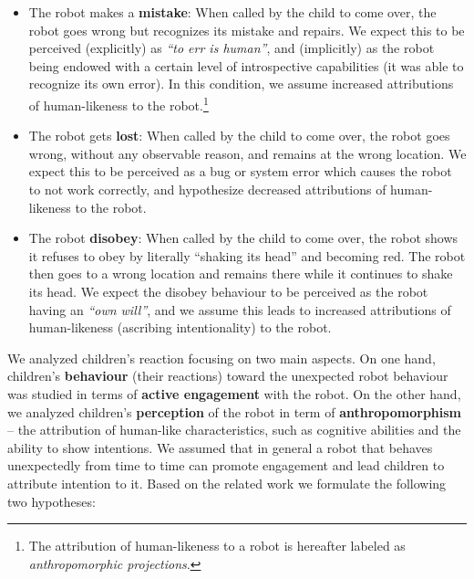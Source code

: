 \documentclass{sig-alternate}
\begin{document}
\begin{itemize}

    \item The robot makes a \textbf{mistake}: When called by the child to come
        over, the robot goes wrong but recognizes its mistake and repairs. We
        expect this to be perceived (explicitly) as \textit{``to err is
        human''}, and (implicitly) as the robot being endowed with a certain
        level of introspective capabilities (it was able to recognize its own
        error). In this condition, we assume increased attributions of
        human-likeness to the robot.\footnote{The attribution of human-likeness
            to a robot is hereafter labeled as \textit{anthropomorphic
        projections}.} 

    \item The robot gets \textbf{lost}: When called by the child to come over,
    the robot goes wrong, without any observable reason, and remains at the
    wrong location. We expect this to be perceived as a bug or system error
    which causes the robot to not work correctly, and hypothesize decreased
    attributions of human-likeness to the robot.

    \item The robot \textbf{disobey}: When called by the child to come over, the
    robot shows it refuses to obey by literally ``shaking its head'' and
    becoming red. The robot then goes to a wrong location and remains there
    while it continues to shake its head. We expect the disobey behaviour to be
    perceived as the robot having an \textit{``own will''}, and we assume this
    leads to increased attributions of human-likeness (ascribing intentionality)
    to the robot.

\end{itemize}

We analyzed children's reaction focusing on two main aspects. On one hand,
children's \textbf{behaviour} (their reactions) toward the unexpected robot
behaviour was studied in terms of \textbf{active engagement} with the robot. On
the other hand, we analyzed children's \textbf{perception} of the robot in term
of \textbf{anthropomorphism} -- the attribution of human-like characteristics,
such as cognitive abilities and the ability to show intentions. We assumed that
in general a robot that behaves unexpectedly from time to time can promote
engagement and lead children to attribute intention to it. Based
on the related work we formulate the following two hypotheses:
\end{document}
